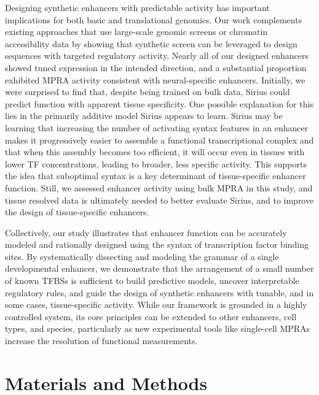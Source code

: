 Designing synthetic enhancers with predictable activity has important implications for both basic and translational genomics. Our work complements existing approaches that use large-scale genomic screens or chromatin accessibility data by showing that synthetic screen can be leveraged to design sequences with targeted regulatory activity. Nearly all of our designed enhancers showed tuned expression in the intended direction, and a substantial proportion exhibited MPRA activity consistent with neural-specific enhancers. Initially, we were surprised to find that, despite being trained on bulk data, Sirius could predict function with apparent tissue specificity. One possible explanation for this lies in the primarily additive model Sirius appears to learn. Sirius may be learning that increasing the number of activating syntax features in an enhancer makes it progressively easier to assemble a functional transcriptional complex and that when this assembly becomes too efficient, it will occur even in tissues with lower TF concentrations, leading to broader, less specific activity. This supports the idea that suboptimal syntax is a key determinant of tissue-specific enhancer function\cite{Farley2015-xx,Farley2016-eh}. Still, we assessed enhancer activity using bulk MPRA in this study, and tissue resolved data is ultimately needed to better evaluate Sirius, and to improve the design of tissue-specific enhancers.

Collectively, our study illustrates that enhancer function can be accurately modeled and rationally designed using the syntax of transcription factor binding sites. By systematically dissecting and modeling the grammar of a single developmental enhancer, we demonstrate that the arrangement of a small number of known TFBSs is sufficient to build predictive models, uncover interpretable regulatory rules, and guide the design of synthetic enhancers with tunable, and in some cases, tissue-specific activity. While our framework is grounded in a highly controlled system, its core principles can be extended to other enhancers, cell types, and species, particularly as new experimental tools like single-cell MPRAs \cite{Zhao2023-ql,Lalanne2024-ts} increase the resolution of functional measurements.

\section{Materials and Methods}

